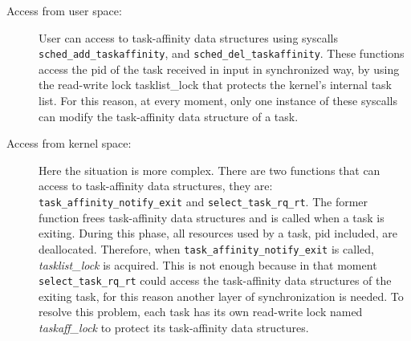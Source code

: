 \begin{description}

\item[Access from user space:] User can access to task-affinity data structures using syscalls \texttt{sched\_add\_taskaffinity}, and 
\texttt{sched\_del\_taskaffinity}. These functions access the pid of the task received in input in synchronized way, by using the read-write lock
tasklist\_lock that protects the kernel's internal task list. For this reason, at every moment, only one instance of these syscalls can modify the
task-affinity data structure of a task.

\item[Access from kernel space:] Here the situation is more complex. There are two functions that can access to task-affinity data structures, they are:
\texttt{task\_affinity\_notify\_exit} and \texttt{select\_task\_rq\_rt}. The former function frees task-affinity data structures and is called when a 
task is exiting. During this phase, all resources used by a task, pid included, are deallocated. Therefore, when \texttt{task\_affinity\_notify\_exit} is 
called, \textit{tasklist\_lock} is acquired. This is not enough because in that moment \texttt{select\_task\_rq\_rt} could access the task-affinity data 
structures of the exiting task, for this reason another layer of synchronization is needed. To resolve this problem, each task has its own read-write lock 
named \textit{taskaff\_lock} to protect its task-affinity data structures. 

\end{description}

